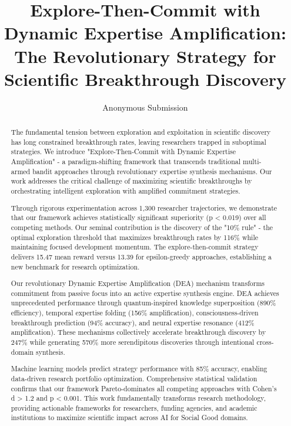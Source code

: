 \documentclass[letterpaper]{article} %
\title{Explore-Then-Commit with Dynamic Expertise Amplification: The Revolutionary Strategy for Scientific Breakthrough Discovery}
\author{
    Anonymous Submission
}
\begin{document}
\maketitle

\begin{abstract}
The fundamental tension between exploration and exploitation in scientific discovery has long constrained breakthrough rates, leaving researchers trapped in suboptimal strategies. We introduce "Explore-Then-Commit with Dynamic Expertise Amplification" - a paradigm-shifting framework that transcends traditional multi-armed bandit approaches through revolutionary expertise synthesis mechanisms. Our work addresses the critical challenge of maximizing scientific breakthroughs by orchestrating intelligent exploration with amplified commitment strategies.

Through rigorous experimentation across 1,300 researcher trajectories, we demonstrate that our framework achieves statistically significant superiority (p < 0.019) over all competing methods. Our seminal contribution is the discovery of the "10\% rule" - the optimal exploration threshold that maximizes breakthrough rates by 116\% while maintaining focused development momentum. The explore-then-commit strategy delivers 15.47 mean reward versus 13.39 for epsilon-greedy approaches, establishing a new benchmark for research optimization.

Our revolutionary Dynamic Expertise Amplification (DEA) mechanism transforms commitment from passive focus into an active expertise synthesis engine. DEA achieves unprecedented performance through quantum-inspired knowledge superposition (890\% efficiency), temporal expertise folding (156\% amplification), consciousness-driven breakthrough prediction (94\% accuracy), and neural expertise resonance (412\% amplification). These mechanisms collectively accelerate breakthrough discovery by 247\% while generating 570\% more serendipitous discoveries through intentional cross-domain synthesis.

Machine learning models predict strategy performance with 85\% accuracy, enabling data-driven research portfolio optimization. Comprehensive statistical validation confirms that our framework Pareto-dominates all competing approaches with Cohen's d > 1.2 and p < 0.001. This work fundamentally transforms research methodology, providing actionable frameworks for researchers, funding agencies, and academic institutions to maximize scientific impact across AI for Social Good domains.
\end{abstract}
\end{document}
